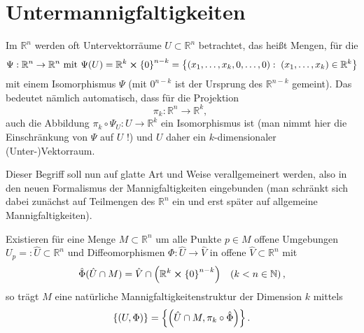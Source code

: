 \documentclass[../H_Analysis_main.tex]{subfiles}
\begin{document}




\newpage


	\section{Untermannigfaltigkeiten}
Im $\mathbb{R}^n$ werden oft Untervektorräume $U \subset \mathbb{R}^n$ betrachtet, das heißt Mengen, für die
\begin{equation*}
\Psi: \mathbb{R}^n \rightarrow \mathbb{R}^n \text{ mit } \Psi(U) = \mathbb{R}^k \cross \qty{0}^{n - k} = \qty{(x_1, \dots, x_k, 0, \dots, 0): \; (x_1, \dots, x_k) \in \mathbb{R}^k}
\end{equation*}
mit einem Isomorphismus $\Psi$ (mit $\qty{0}^{n - k}$ ist der Ursprung des $\mathbb{R}^{n - k}$ gemeint). Das bedeutet nämlich automatisch, dass für die Projektion
\begin{equation*}
\pi_k: \mathbb{R}^n \rightarrow \mathbb{R}^k, \; 
\end{equation*}
auch die Abbildung $\pi_k \circ \Psi_U: U \rightarrow \mathbb{R}^k$ ein Isomorphismus ist (man nimmt hier die Einschränkung von $\Psi$ auf $U$ !) und $U$ daher ein $k$-dimensionaler (Unter-)Vektorraum.


Dieser Begriff soll nun auf glatte Art und Weise verallgemeinert werden, also in den neuen Formalismus der Mannigfaltigkeiten eingebunden (man schränkt sich dabei zunächst auf Teilmengen des $\mathbb{R}^n$ ein und erst später auf allgemeine Mannigfaltigkeiten).
\begin{satz}
Existieren für eine Menge $M \subset \mathbb{R}^n$ um alle Punkte $p \in M$ offene Umgebungen $U_p =: \hat{U} \subset \mathbb{R}^n$ und Diffeomorphismen $\Phi: \hat{U} \rightarrow \hat{V}$ in offene $\hat{V} \subset \mathbb{R}^n$ mit
\begin{equation}
\hat{\Phi}(\hat{U} \cap M) = \hat{V} \cap \qty(\mathbb{R}^k \cross \qty{0}^{n - k}) \quad (k < n \in \mathbb{N}) \, ,
\end{equation}
so trägt $M$ eine natürliche Mannigfaltigkeitenstruktur der Dimension $k$ mittels
\begin{equation}
\qty{\qty(U, \Phi)} = \qty{\qty(\hat{U} \cap M, \pi_k \circ \hat{\Phi})} \, .
\end{equation}
\end{satz}
\end{document}

